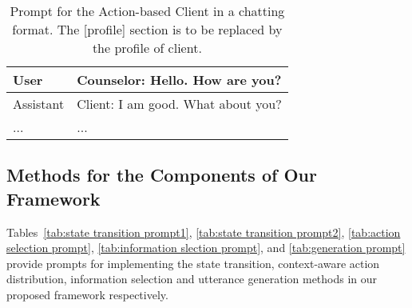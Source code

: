 \begin{table*}[tb]
\begin{tabularx}{\textwidth}{lX}
User         & Counselor: Hello. How are you?                                                                                                           \\ \hline
Assistant    & Client: I am good. What about you?                                                                          \\ \hline
...           & ...             \\ \bottomrule
\end{tabularx}

\caption{Prompt for the Action-based Client in a chatting format. The [profile] section is to be replaced by the profile of client.}
\label{tab:action based prompt}
\end{table*}


\subsection{Methods for the Components of Our Framework}
\label{app:our frame implement}

Tables~\ref{tab:state transition prompt1}, \ref{tab:state transition prompt2}, \ref{tab:action selection prompt}, \ref{tab:information slection prompt}, and \ref{tab:generation prompt} provide prompts for implementing the state transition, context-aware action distribution, information selection and utterance generation methods in our proposed framework respectively.

